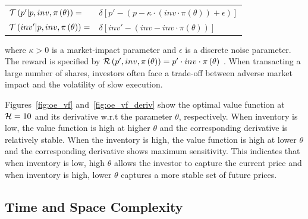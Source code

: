\documentclass[letterpaper]{article}
\begin{document}
{\footnotesize 
    \begin{tabular}{ll}
        $\mathcal{T}\left( p' | p, inv, \pi\left( \theta \right) \right) =$ & $ \delta \left[ p' - (p - \kappa \cdot (inv \cdot \pi\left( \theta \right)) + \epsilon) \right] $ \\
        $\mathcal{T}\left( inv' | p, inv, \pi\left( \theta \right) \right) =$ & $\delta \left[ inv' - (inv - inv \cdot \pi\left( \theta \right)) \right] $ \\
    \end{tabular}
}%
where {\footnotesize $ \kappa > 0$} is a market-impact parameter and {\footnotesize $ \epsilon $} is a discrete noise parameter. The reward is specified by {\footnotesize $ \mathcal{R}\left(p', inv, \pi\left( \theta \right) \right) = p' \cdot inv \cdot \pi\left( \theta \right)$ }. 
When transacting a large number of shares, investors often face a trade-off between adverse market impact and the volatility of slow execution.



Figures~\ref{fig:oe_vf} and~\ref{fig:oe_vf_deriv} show the optimal value function at {\footnotesize $ \mathcal{H} = 10 $} and its derivative w.r.t the parameter {\footnotesize $ \theta$}, respectively. When inventory is low, the value function is high at higher {\footnotesize $ \theta$} and the corresponding derivative is relatively stable. When the inventory is high, the value function is high at lower {\footnotesize $ \theta$} and the corresponding derivative shows maximum sensitivity. 
This indicates that when inventory is low, high {\footnotesize $\theta$} allows the investor to capture the current price and when inventory is high, lower {\footnotesize $\theta$} captures a more stable set of future prices. 
\subsection{Time and Space Complexity}
\end{document}

